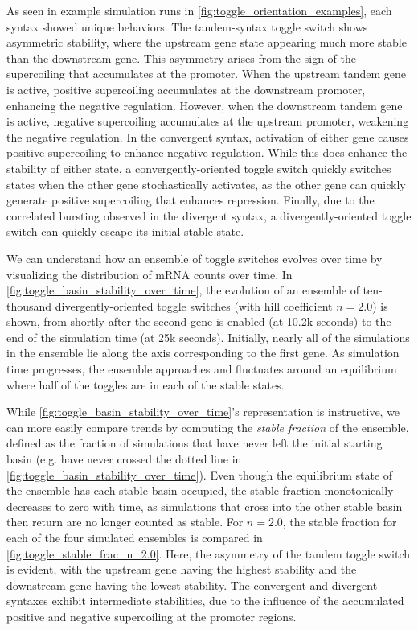 \documentclass[11pt]{article}
\begin{document}
As seen in example simulation runs in \cref{fig:toggle_orientation_examples}, each syntax showed unique behaviors. The tandem-syntax toggle switch shows asymmetric stability, where the upstream gene state appearing much more stable than the downstream gene. This asymmetry arises from the sign of the supercoiling that accumulates at the promoter. When the upstream tandem gene is active, positive supercoiling accumulates at the downstream promoter, enhancing the negative regulation. However, when the downstream tandem gene is active, negative supercoiling accumulates at the upstream promoter, weakening the negative regulation. In the convergent syntax, activation of either gene causes positive supercoiling to enhance negative regulation. While this does enhance the stability of either state, a convergently-oriented toggle switch quickly switches states when the other gene stochastically activates, as the other gene can quickly generate positive supercoiling that enhances repression. Finally, due to the correlated bursting observed in the divergent syntax, a divergently-oriented toggle switch can quickly escape its initial stable state.

We can understand how an ensemble of toggle switches evolves over time by visualizing the distribution of mRNA counts over time. In \cref{fig:toggle_basin_stability_over_time}, the evolution of an ensemble of ten-thousand divergently-oriented toggle switches (with hill coefficient \(n = 2.0\)) is shown, from shortly after the second gene is enabled (at 10.2k seconds) to the end of the simulation time (at 25k seconds). Initially, nearly all of the simulations in the ensemble lie along the axis corresponding to the first gene. As simulation time progresses, the ensemble approaches and fluctuates around an equilibrium where half of the toggles are in each of the stable states.

While \cref{fig:toggle_basin_stability_over_time}'s representation is instructive, we can more easily compare trends by computing the \emph{stable fraction} of the ensemble, defined as the fraction of simulations that have never left the initial starting basin (e.g. have never crossed the dotted line in \cref{fig:toggle_basin_stability_over_time}). Even though the equilibrium state of the ensemble has each stable basin occupied, the stable fraction monotonically decreases to zero with time, as simulations that cross into the other stable basin then return are no longer counted as stable. For \(n = 2.0\), the stable fraction for each of the four simulated ensembles is compared in \cref{fig:toggle_stable_frac_n_2.0}. Here, the asymmetry of the tandem toggle switch is evident, with the upstream gene having the highest stability and the downstream gene having the lowest stability. The convergent and divergent syntaxes exhibit intermediate stabilities, due to the influence of the accumulated positive and negative supercoiling at the promoter regions.
\end{document}
